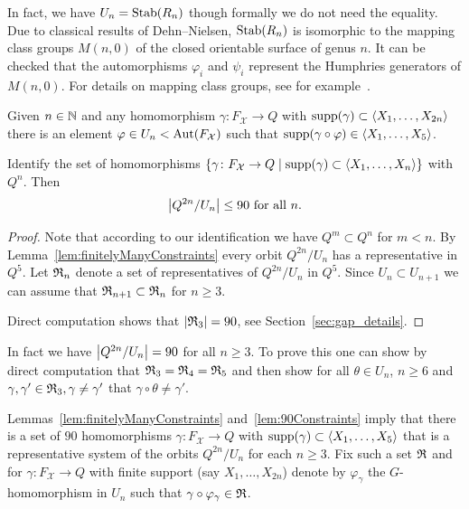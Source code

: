 \documentclass[a4paper,11pt]{amsart}
\begin{document}
\begin{re}
In fact, we have $U_n = \operatorname{Stab}(R_n)$ though formally we do not need the equality. 
Due to classical results of Dehn--Nielsen, $\operatorname{Stab}(R_n)$ is isomorphic to 
the mapping class groups $M(n,0)$ of the closed orientable surface of genus $n$. It can be checked that
the automorphisms $\varphi_i$ and $\psi_i$ represent the Humphries generators of $M(n,0)$.
For details on mapping class groups, see for example~\cite{Farb-Margalit:MCG}.
\end{re}

\begin{lem}\label{lem:finitelyManyConstraints}
 Given $n\in \mathbb{N}$ and any homomorphism $\gamma\colon F_{\mathcal{X}} \to Q$ with $\operatorname{{supp}}(\gamma) \subset \left<X_1,\ldots ,X_{2n}\right>$
 there is an element $\varphi \in U_n<\operatorname{{Aut}}(F_{\mathcal{X}})$ such that $\operatorname{{supp}}(\gamma\circ\varphi) \in \left<X_1,\dotsc,X_5\right>$.
\end{lem}
\begin{lem}\label{lem:90Constraints}
 Identify the set of homomorphisms $\{\gamma \colon F_{\mathcal{X}} \to Q \mid \operatorname{{supp}}(\gamma) \subset \left<X_1,\ldots, X_n\right>\}$ with $Q^{n}$. 
 Then 
 \[\left|{Q^{2n}/U_n}\right|\leq 90 \text{ for all } n.\]
\end{lem}
\begin{proof}
Note that according to our identification we have $Q^m \subset Q^n$ for $m < n$.
By Lemma~\ref{lem:finitelyManyConstraints} every orbit $Q^{2n} / U_n$ has a representative in $Q^5$.
Let $\mathfrak{R}_n$ denote a set of representatives of $Q^{2n}/ U_n$ in $Q^5$. 
Since $U_n \subset U_{n+1}$ we can assume that $\mathfrak{R}_{n+1} \subset \mathfrak{R}_n$ for $n \ge 3$.


Direct computation shows that $|\mathfrak{R}_3| = 90$,
see Section~\ref{sec:gap_details}.
\end{proof}
\begin{re}
 In fact we have $\left|{Q^{2n}/U_n}\right|= 90$ for all $n\geq3$.
  To prove this one can show by direct computation that
   $\mathfrak{R}_3=\mathfrak{R}_4=\mathfrak{R}_5$ and then show for all $\theta\in U_n$,
    $n\geq6$ and $\gamma,\gamma'\in\mathfrak{R}_3,\gamma\neq\gamma'$
 that $\gamma\circ \theta\neq\gamma'$.
\end{re}

Lemmas~\ref{lem:finitelyManyConstraints} and~\ref{lem:90Constraints}
imply that there is a set of $90$ homomorphisms
$\gamma\colon F_{\mathcal{X}} \to Q$ with
$\operatorname{{supp}}(\gamma) \subset \left<X_1,\ldots, X_5\right>$ that is a
representative system of the orbits $Q^{2n} / U_n$ for each $n \ge 3$.
Fix such a set $\mathfrak{R}$ and for $\gamma \colon F_{\mathcal{X}} \to Q$
with finite support (say $X_1,\dots,X_{2n}$) denote by
$\varphi_\gamma$ the $G$-homomorphism in $U_n$ such that
$\gamma\circ \varphi_\gamma \in \mathfrak{R}$.
 
\end{document}
